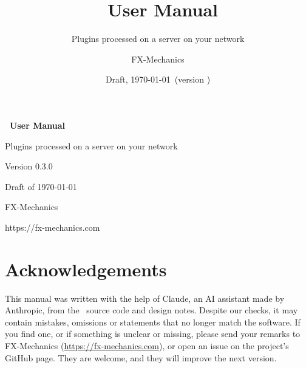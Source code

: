 \documentclass[a4paper,11pt,openany,headings=small,numbers=noenddot]{scrbook}
\title{\fxme\ User Manual}
\subtitle{Plugins processed on a server on your network}
\author{FX-Mechanics}
\date{Draft, \today\ (version \fxmenetversion)}
\newcommand{\fxmenetversion}{0.3.0}
\begin{document}
\frontmatter

\begin{titlepage}
  \centering
  \vspace*{14mm}
  \par
  \vspace{14mm}
  {\sffamily\bfseries\Huge \fxme\ User Manual\par}
  \vspace{4mm}
  {\sffamily\Large Plugins processed on a server on your network\par}
  \vspace{16mm}
  {\large Version \fxmenetversion\par}
  \vspace{2mm}
  {\large Draft of \today\par}
  \vfill
  {\large FX-Mechanics\par}
  {\normalsize https://fx-mechanics.com\par}
\end{titlepage}

\chapter*{Acknowledgements}

This manual was written with the help of Claude, an AI assistant made by
Anthropic, from the \fxme\ source code and design notes. Despite our checks,
it may contain mistakes, omissions or statements that no longer match the
software. If you find one, or if something is unclear or missing, please send
your remarks to FX-Mechanics (\url{https://fx-mechanics.com}), or open an
issue on the project's GitHub page. They are welcome, and they will improve
the next version.

\tableofcontents

\mainmatter
















\end{document}
